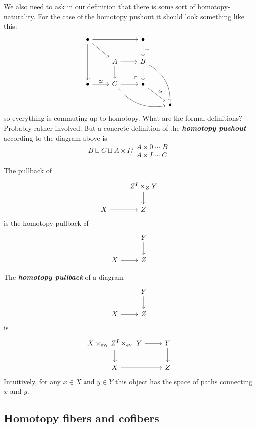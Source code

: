 \begin{remark}
	We also need to ask in our definition that there is some sort of homotopy-naturality. For the case of the homotopy pushout it should look something like this:
		\[\begin{tikzcd}
			\bullet\arrow[rr]\arrow[dd]\arrow[dr]&&\bullet\arrow[d,"\simeq "]\\
			&A\arrow[r]\arrow[d]&B\arrow[d]\arrow[ddr,bend left]\\
			\bullet\arrow[r,"\simeq "]&C\arrow[r]\arrow[drr,bend right]&\bullet\arrow[ul, phantom, "\ulcorner", very near start]\arrow[dr,"\simeq" ]\\
			&&&\bullet
		\end{tikzcd}\]
	so everything is commuting up to homotopy. {\color{magenta}What are the formal definitions? Probably rather involved.} But a concrete definition of the \textit{\textbf{homotopy pushout}} according to the diagram above is
	\[B\sqcup C\sqcup A\times I\Big/\substack{A\times 0\sim B \\ A\times I\sim C}\]
\end{remark}
\begin{remark}
		The pullback of
	\[\begin{tikzcd}
		&Z^I\times_ZY\arrow[d]\\
		X\arrow[r]&Z
	\end{tikzcd}\]
	is the homotopy pullback of
	\[\begin{tikzcd}
		&Y\arrow[d]\\
		X\arrow[r]&Z
	\end{tikzcd}\]
\end{remark}
\begin{defn}
	The \textbf{\textit{homotopy pullback}} of a diagram
		\[\begin{tikzcd}
			&Y\arrow[d]\\
			X\arrow[r]&Z
		\end{tikzcd}\]
		is
		\[\begin{tikzcd}
			X\times_{\operatorname{ev}_0}Z^I\times_{\operatorname{ev}_1}Y\arrow[d]\arrow[r]&Y\arrow[d]\\
			X\arrow[r]&Z
		\end{tikzcd}\]
		Intuitively, for any $x\in X$ and $y\in Y$ this object has the space of paths connecting $x$ and $y$.
\end{defn}

\subsection{Homotopy fibers and cofibers}

